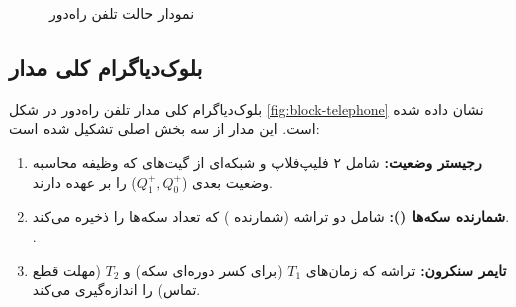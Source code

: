 \documentclass[12pt]{article}
\begin{document}
\begin{figure}[htbp]
		\endL
		\caption{نمودار حالت تلفن راه‌دور}
		\label{fig:asm-chart-telephone}
	\end{figure}
	
	\subsection{بلوک‌دیاگرام کلی مدار}
	بلوک‌دیاگرام کلی مدار تلفن راه‌دور در شکل \ref{fig:block-telephone} نشان داده شده است. این مدار از سه بخش اصلی تشکیل شده است:
	\begin{enumerate}
		\item \textbf{رجیستر وضعیت:} شامل ۲ فلیپ‌فلاپ  و شبکه‌ای از گیت‌های  که وظیفه محاسبه وضعیت بعدی ($Q_1^+, Q_0^+$) را بر عهده دارند.
		\item \textbf{شمارنده سکه‌ها ():} شامل دو تراشه  (شمارنده ) که تعداد سکه‌ها را ذخیره می‌کند. .
		\item \textbf{تایمر سنکرون:} تراشه  که زمان‌های $T_1$ (برای کسر دوره‌ای سکه) و $T_2$ (مهلت قطع تماس) را اندازه‌گیری می‌کند.
	\end{enumerate}
	
\end{document}
